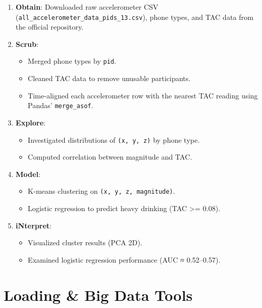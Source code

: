 \documentclass[
  letterpaper,
  DIV=11,
  numbers=noendperiod]{scrartcl}
\providecommand{\tightlist}{%
  \setlength{\itemsep}{0pt}\setlength{\parskip}{0pt}}\usepackage{longtable,booktabs,array}
\begin{document}
\begin{enumerate}
\def\labelenumi{\arabic{enumi}.}
\tightlist
\item
  \textbf{Obtain}: Downloaded raw accelerometer CSV
  (\texttt{all\_accelerometer\_data\_pids\_13.csv}), phone types, and
  TAC data from the official repository.
\item
  \textbf{Scrub}:

  \begin{itemize}
  \tightlist
  \item
    Merged phone types by \texttt{pid}.
  \item
    Cleaned TAC data to remove unusable participants.
  \item
    Time-aligned each accelerometer row with the nearest TAC reading
    using Pandas' \texttt{merge\_asof}.
  \end{itemize}
\item
  \textbf{Explore}:

  \begin{itemize}
  \tightlist
  \item
    Investigated distributions of \texttt{(x,\ y,\ z)} by phone type.
  \item
    Computed correlation between magnitude and TAC.
  \end{itemize}
\item
  \textbf{Model}:

  \begin{itemize}
  \tightlist
  \item
    K-means clustering on \texttt{(x,\ y,\ z,\ magnitude)}.
  \item
    Logistic regression to predict heavy drinking (TAC \textgreater=
    0.08).
  \end{itemize}
\item
  \textbf{iNterpret}:

  \begin{itemize}
  \tightlist
  \item
    Visualized cluster results (PCA 2D).
  \item
    Examined logistic regression performance (AUC ≈ 0.52--0.57).
  \end{itemize}
\end{enumerate}

\section{Loading \& Big Data Tools}\label{loading-big-data-tools}
\end{document}
